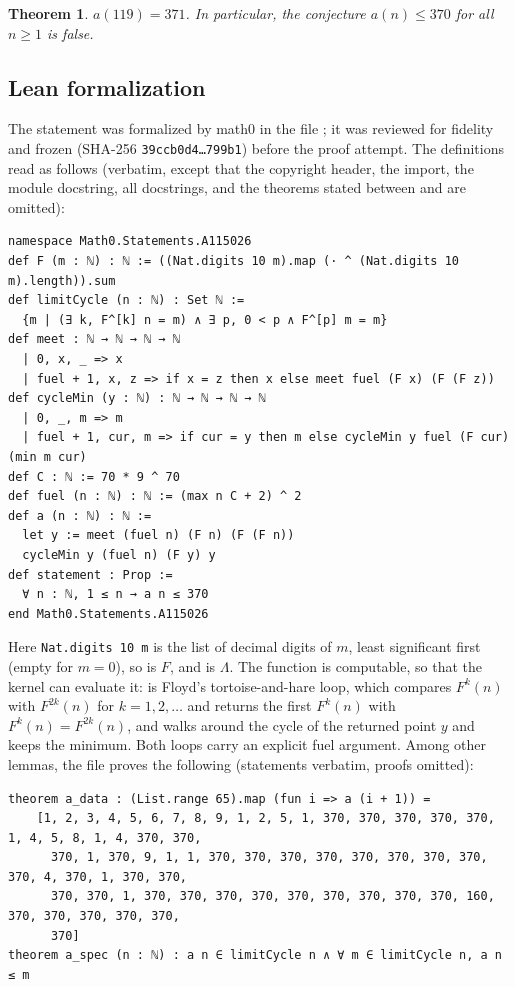\documentclass[11pt]{amsart}
\theoremstyle{plain}
\newtheorem{theorem}{Theorem}
\theoremstyle{definition}
\newcommand{\Cyc}{\Lambda}
\begin{document}
\begin{theorem}\label{thm:main}
$a(119)=371$. In particular, the conjecture $a(n)\le370$ for all $n\ge1$ is false.
\end{theorem}

\subsection*{Lean formalization}
The statement was formalized by math0 in the file ; it was reviewed for fidelity and frozen (SHA-256 \texttt{39ccb0d4\ldots 799b1}) before the proof attempt. The definitions read as follows (verbatim, except that the copyright header, the import, the module docstring, all docstrings, and the theorems stated between  and  are omitted):
\begin{lstlisting}
namespace Math0.Statements.A115026
def F (m : ℕ) : ℕ := ((Nat.digits 10 m).map (· ^ (Nat.digits 10 m).length)).sum
def limitCycle (n : ℕ) : Set ℕ :=
  {m | (∃ k, F^[k] n = m) ∧ ∃ p, 0 < p ∧ F^[p] m = m}
def meet : ℕ → ℕ → ℕ → ℕ
  | 0, x, _ => x
  | fuel + 1, x, z => if x = z then x else meet fuel (F x) (F (F z))
def cycleMin (y : ℕ) : ℕ → ℕ → ℕ → ℕ
  | 0, _, m => m
  | fuel + 1, cur, m => if cur = y then m else cycleMin y fuel (F cur) (min m cur)
def C : ℕ := 70 * 9 ^ 70
def fuel (n : ℕ) : ℕ := (max n C + 2) ^ 2
def a (n : ℕ) : ℕ :=
  let y := meet (fuel n) (F n) (F (F n))
  cycleMin y (fuel n) (F y) y
def statement : Prop :=
  ∀ n : ℕ, 1 ≤ n → a n ≤ 370
end Math0.Statements.A115026
\end{lstlisting}
Here \texttt{Nat.digits 10 m} is the list of decimal digits of $m$, least significant first (empty for $m=0$), so  is $F$, and  is $\Cyc$.
The function  is computable, so that the kernel can evaluate it:  is Floyd's tortoise-and-hare loop, which compares $F^k(n)$ with $F^{2k}(n)$ for $k=1,2,\dots$ and returns the first $F^k(n)$ with $F^k(n)=F^{2k}(n)$, and  walks around the cycle of the returned point $y$ and keeps the minimum. Both loops carry an explicit fuel argument.
Among other lemmas, the file proves the following (statements verbatim, proofs omitted):
\begin{lstlisting}
theorem a_data : (List.range 65).map (fun i => a (i + 1)) =
    [1, 2, 3, 4, 5, 6, 7, 8, 9, 1, 2, 5, 1, 370, 370, 370, 370, 370, 1, 4, 5, 8, 1, 4, 370, 370,
      370, 1, 370, 9, 1, 1, 370, 370, 370, 370, 370, 370, 370, 370, 370, 4, 370, 1, 370, 370,
      370, 370, 1, 370, 370, 370, 370, 370, 370, 370, 370, 370, 160, 370, 370, 370, 370, 370,
      370]
theorem a_spec (n : ℕ) : a n ∈ limitCycle n ∧ ∀ m ∈ limitCycle n, a n ≤ m
\end{lstlisting}
\end{document}
